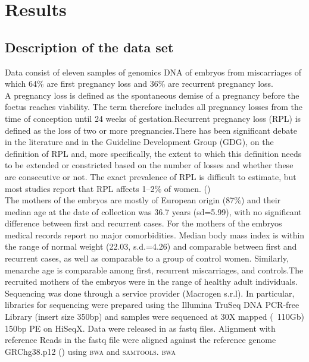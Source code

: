 
\chapter{Results}
\section{Description of the data set}
Data consist of eleven samples of genomics DNA of embryos from miscarriages of which 64\% are first pregnancy loss and 36\% are recurrent pregnancy loss.\\ 
A pregnancy loss is defined as the spontaneous demise of a pregnancy before the foetus reaches viability. The term therefore includes all pregnancy losses from the time of conception until 24 weeks of gestation.Recurrent pregnancy loss (RPL) is defined as the loss of two or more pregnancies.There has been significant debate in the literature and in the Guideline Development Group (GDG), on the definition of RPL and, more specifically, the extent to which this definition needs to be extended or constricted based on the number of losses and whether these are consecutive or not.
The exact prevalence of RPL is difficult to estimate, but most studies report that RPL affects 1–2\% of women. (\cite{eshre2018eshre})\\
The mothers of the embryos are mostly of European origin (87\%) and their median age at the date of collection was 36.7 years (sd=5.99), with no significant difference between first and recurrent cases. For the mothers of the embryos medical records report no major comorbidities. Median body mass index is within the range of normal weight (22.03, s.d.=4.26) and comparable between first and recurrent cases, as well as comparable to a group of control women. Similarly, menarche age is comparable among first, recurrent miscarriages, and controls.The recruited mothers of the embryos were in the range of healthy adult individuals.  \\
Sequencing was done through a service provider (Macrogen s.r.l). In particular, libraries for sequencing were prepared using the Illumina TruSeq DNA PCR-free Library (insert size 350bp) and samples were sequenced at 30X mapped (~110Gb) 150bp PE on HiSeqX. Data were released in as fastq files. 
Alignment with reference Reads in the fastq file were aligned against the reference genome GRChg38.p12 (\cite{rosenbloom2015ucsc}) using \textsc{bwa} and \textsc{samtools}. \textsc{bwa}

